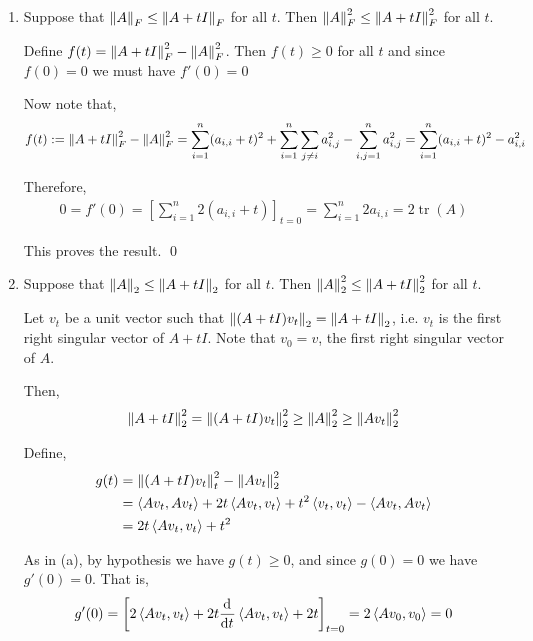 \documentclass[10pt]{article}
\begin{document}
\begin{solution}[Solution]
\begin{enumerate}[label=(\alph*)]
    \item 
        Suppose that \( \left\lVert A\right\rVert_F\leq \left\lVert A+tI\right\rVert_F \) for all \( t \). Then \( \left\lVert A\right\rVert_F^2 \leq \left\lVert A+tI\right\rVert_F^2 \) for all \( t \).
        
        Define \( f(t) = \left\lVert A+tI\right\rVert_F^2 - \left\lVert A\right\rVert_F^2 \). Then \( f(t) \geq 0 \) for all \( t \) and since \( f(0) = 0 \) we must have \( f'(0) = 0 \)

        Now note that,
        \begin{align*}
            f(t) := \left\lVert A+tI\right\rVert_F^2 - \left\lVert A\right\rVert_F^2 = \sum_{i=1}^{n} (a_{i,i}+t)^2 + \sum_{i=1}^{n} \sum_{j\neq i} a_{i,j}^2 - \sum_{i,j=1}^{n}a_{i,j}^2
            = \sum_{i=1}^{n} (a_{i,i}+t)^2 - a_{i,i}^2
        \end{align*}
        
        Therefore,
        \begin{align*}
            0 = f'(0) = \left[\sum_{i=1}^{n} 2(a_{i,i}+t)\right]_{t=0} = \sum_{i=1}^{n}2 a_{i,i} = 2\operatorname{tr}(A)
        \end{align*}
        
        This proves the result. \qed

    \item
        Suppose that \( \left\lVert A\right\rVert_2\leq \left\lVert A+tI\right\rVert_2 \) for all \( t \). Then \( \left\lVert A\right\rVert_2^2 \leq \left\lVert A+tI\right\rVert_2^2 \) for all \( t \).
        
        Let \( v_t \) be a unit vector such that \( \left\lVert(A+tI)v_t\right\rVert_2 = \left\lVert A+tI\right\rVert_2 \), i.e. \( v_t \) is the first right singular vector of \( A+tI \). Note that \( v_0 = v \), the first right singular vector of \( A \).

        Then,
        \begin{align*}
            \left\lVert A+tI\right\rVert_2^2 = \left\lVert(A+tI)v_t\right\rVert_2^2  \geq \left\lVert A\right\rVert_2^2 \geq \left\lVert Av_t\right\rVert_2^2
        \end{align*}
        
        Define, 
        \begin{align*}
            g(t) &= \left\lVert(A+tI)v_t\right\rVert_t^2 - \left\lVert Av_t\right\rVert_2^2 
            \\&= \left\langle Av_t,Av_t \right\rangle + 2t \left\langle Av_t,v_t \right\rangle + t^2\left\langle v_t,v_t \right\rangle - \left\langle Av_t,Av_t \right\rangle
            \\&= 2 t \left\langle Av_t,v_t \right\rangle + t^2
        \end{align*}

        As in (a), by hypothesis we have \( g(t) \geq 0 \), and since \( g(0) = 0 \) we have \( g'(0) = 0 \). That is,
        \begin{align*}
            g'(0) = \left[2\left\langle Av_t,v_t \right\rangle + 2t \frac{\mathrm{d}^{}}{\mathrm{d} t^{}} \left\langle Av_t,v_t \right\rangle + 2t \right]_{t=0} = 2\left\langle A v_0,v_0 \right\rangle = 0
        \end{align*}


\end{enumerate}
\end{solution}
\end{document}

